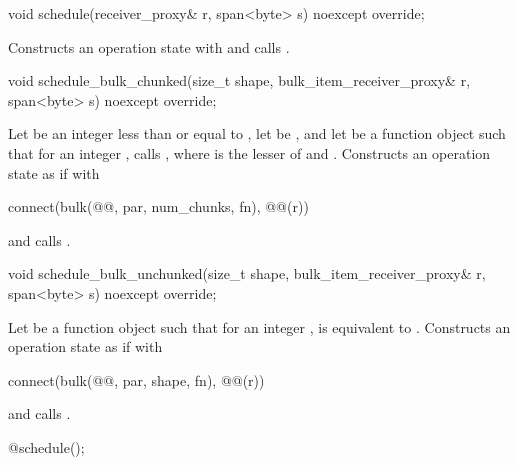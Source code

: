\begin{itemdecl}
void schedule(receiver_proxy& r, span<byte> s) noexcept override;
\end{itemdecl}

\begin{itemdescr}
\pnum
\effects
Constructs an operation state 
with  and
calls .
\end{itemdescr}

\begin{itemdecl}
void schedule_bulk_chunked(size_t shape, bulk_item_receiver_proxy& r,
                           span<byte> s) noexcept override;
\end{itemdecl}

\begin{itemdescr}
\pnum
\effects
Let  be an integer less than or equal to ,
let  be , and
let  be a function object such that
for an integer ,
 calls ,
where  is the lesser of  and .
Constructs an operation state  as if with
\begin{codeblock}
connect(bulk(@@, par, num_chunks, fn), @@(r))
\end{codeblock}
and calls .
\end{itemdescr}

\begin{itemdecl}
void schedule_bulk_unchunked(size_t shape, bulk_item_receiver_proxy& r,
                             span<byte> s) noexcept override;
\end{itemdecl}

\begin{itemdescr}
\pnum
\effects
Let  be a function object such that
for an integer ,
 is equivalent to .
Constructs an operation state  as if with
\begin{codeblock}
connect(bulk(@@, par, shape, fn), @@(r))
\end{codeblock}
and calls .
\end{itemdescr}

\begin{itemdecl}
@\seebelow@ schedule();
\end{itemdecl}

